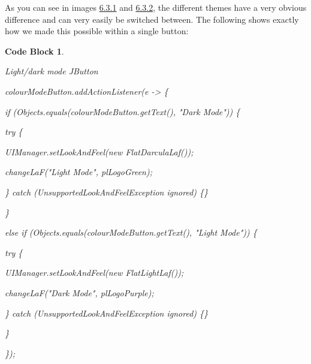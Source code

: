 \documentclass[12pt, a4paper, oneside]{book}
\newtheorem{codeblock}[theorem]{Code Block}
\numberwithin{equation}{section}
\begin{document}
As you can see in images \hyperref[Dark mode button]{6.3.1} and \hyperref[Light mode button]{6.3.2}, the different themes have a very obvious difference and can very easily be switched between. The following shows exactly how we made this possible within a single button:

\begin{codeblock} \label{Light/dark mode JButton}

  Light/dark mode JButton

  colourModeButton.addActionListener(e -> \{

  \hspace{\parindent}if (Objects.equals(colourModeButton.getText(), "Dark Mode")) \{

  \hspace{\parindent}\hspace{\parindent}try \{

  \hspace{\parindent}\hspace{\parindent}\hspace{\parindent}UIManager.setLookAndFeel(new FlatDarculaLaf());

  \hspace{\parindent}\hspace{\parindent}\hspace{\parindent}changeLaF("Light Mode", plLogoGreen);

  \hspace{\parindent}\hspace{\parindent}\} catch (UnsupportedLookAndFeelException ignored) \{\}
  
  \hspace{\parindent}\}
  
  \hspace{\parindent}else if (Objects.equals(colourModeButton.getText(), "Light Mode")) \{
  
  \hspace{\parindent}\hspace{\parindent}try \{
  
  \hspace{\parindent}\hspace{\parindent}\hspace{\parindent}UIManager.setLookAndFeel(new FlatLightLaf());
  
  \hspace{\parindent}\hspace{\parindent}\hspace{\parindent}changeLaF("Dark Mode", plLogoPurple);
  
  \hspace{\parindent}\hspace{\parindent}\} catch (UnsupportedLookAndFeelException ignored) \{\}
  
  \hspace{\parindent}\}
  
  \});

\end{codeblock}
\end{document}
